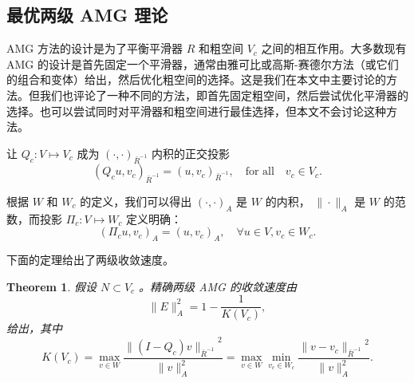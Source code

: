 \documentclass[12pt]{acta_2011xz}
\newcommand{\Tnorm}[1]{\ensuremath{\|#1\|_{\bar R^{-1}}}}
\newcommand{\Tproj}{\ensuremath{Q_c}}
\newtheorem{theorem}{Theorem}[section]
\begin{document}
   \subsection{最优两级 AMG 理论  }       \label{2-level-theory}    AMG 方法的设计是为了平衡平滑器
   $R$    和粗空间    $V_c$    之间的相互作用。大多数现有 AMG 的设计是首先固定一个平滑器，通常由雅可比或高斯-赛德尔方法（或它们的组合和变体）给出，然后优化粗空间的选择。这是我们在本文中主要讨论的方法。但我们也评论了一种不同的方法，即首先固定粗空间，然后尝试优化平滑器的选择。也可以尝试同时对平滑器和粗空间进行最佳选择，但本文不会讨论这种方法。  

让    $Q_c:V\mapsto V_c $    成为    $(\cdot,\cdot)_{\bar{R}^{-1}}$    内积的正交投影
   \begin{equation}\label{e:qc}
(Q_cu,v_c)_{\bar{R}^{-1}} = (u,v_c)_{\bar{R}^{-1}}, \quad\mbox{for
  all}\quad v_c\in V_c. 
\end{equation}     

根据    $W$    和    $W_c$    的定义，我们可以得出    $(\cdot, \cdot)_A$    是    $W$    的内积，
   $\|\cdot\|_A$    是    $W$    的范数，而投影
   $\Pi_c: V\mapsto W_c$    定义明确：
   \begin{equation}\label{e:77}
(\Pi_cu,v_c)_A = (u,v_c)_A, \quad \forall u\in V, v_c\in W_c.
\end{equation}     

下面的定理给出了两级收敛速度。  

   \begin{theorem}   \label{thm:two-level-convergence}    假设    $N\subset V_c$    。精确两级 AMG 的收敛速度由 
   \begin{equation}\label{eq:two-level-convergence}
\|E\|_A^2 = 1- \frac1{K(V_c)}, 
\end{equation}    给出，其中
   \begin{equation}
  \label{KVc}
K(V_c)=\max_{v\in W}\frac{\Tnorm{(I-\Tproj)v}^2}{\|v\|^2_A}
=\max_{v\in W}\min_{v_c\in W_c}\frac{\Tnorm{v-v_c}^2}{\|v\|^2_A}.
\end{equation}     \end{theorem}     
\end{document}
